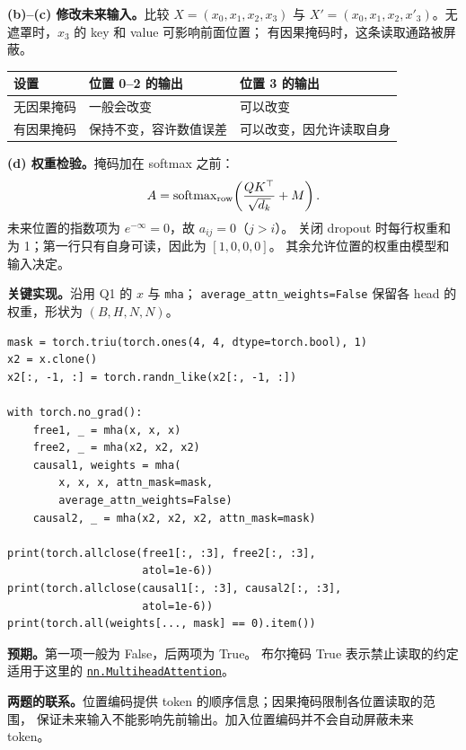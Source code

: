 \textbf{(b)--(c) 修改未来输入。}比较 $X=(x_0,x_1,x_2,x_3)$ 与
$X'=(x_0,x_1,x_2,x'_3)$。无遮罩时，$x_3$ 的 key 和 value 可影响前面位置；
有因果掩码时，这条读取通路被屏蔽。
\begin{center}
\small
\begin{tabularx}{\textwidth}{@{}lXX@{}}
\toprule
设置 & 位置 0--2 的输出 & 位置 3 的输出 \\
\midrule
无因果掩码 & 一般会改变 & 可以改变 \\
有因果掩码 & 保持不变，容许数值误差 & 可以改变，因允许读取自身 \\
\bottomrule
\end{tabularx}
\end{center}

\textbf{(d) 权重检验。}掩码加在 softmax 之前：
\[
 A=\operatorname{softmax}_{\rm row}
 \!\left(\frac{QK^\top}{\sqrt{d_k}}+M\right).
\]
未来位置的指数项为 $e^{-\infty}=0$，故 $a_{ij}=0$（$j>i$）。
关闭 dropout 时每行权重和为 1；第一行只有自身可读，因此为 $[1,0,0,0]$。
其余允许位置的权重由模型和输入决定。

\textbf{关键实现。}沿用 Q1 的 $x$ 与 \texttt{mha}；
\texttt{average\_attn\_weights=False} 保留各 head 的权重，形状为 $(B,H,N,N)$。
\par
\begingroup
\linespread{1}\fontsize{9}{11}\selectfont
\begin{verbatim}
mask = torch.triu(torch.ones(4, 4, dtype=torch.bool), 1)
x2 = x.clone()
x2[:, -1, :] = torch.randn_like(x2[:, -1, :])

with torch.no_grad():
    free1, _ = mha(x, x, x)
    free2, _ = mha(x2, x2, x2)
    causal1, weights = mha(
        x, x, x, attn_mask=mask,
        average_attn_weights=False)
    causal2, _ = mha(x2, x2, x2, attn_mask=mask)

print(torch.allclose(free1[:, :3], free2[:, :3],
                     atol=1e-6))
print(torch.allclose(causal1[:, :3], causal2[:, :3],
                     atol=1e-6))
print(torch.all(weights[..., mask] == 0).item())
\end{verbatim}
\endgroup
\textbf{预期。}第一项一般为 False，后两项为 True。
布尔掩码 True 表示禁止读取的约定适用于这里的
\href{https://docs.pytorch.org/docs/2.14/generated/torch.nn.MultiheadAttention.html}
{\texttt{nn.MultiheadAttention}}。

\textbf{两题的联系。}位置编码提供 token 的顺序信息；因果掩码限制各位置读取的范围，
保证未来输入不能影响先前输出。加入位置编码并不会自动屏蔽未来 token。
\endgroup
